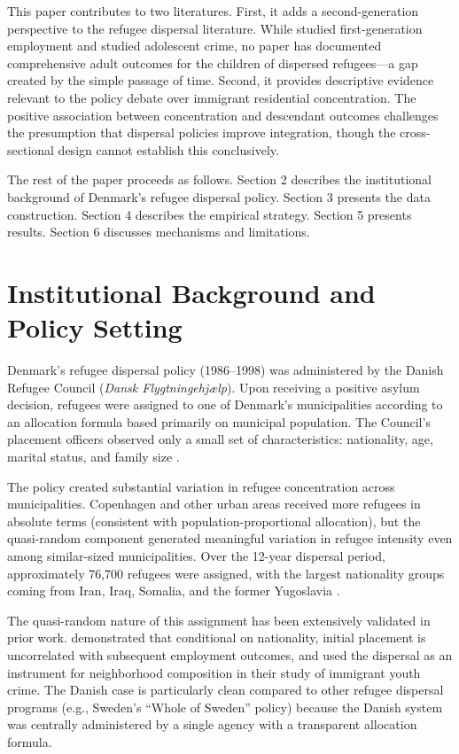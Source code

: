 \documentclass[12pt]{article}
\begin{document}
This paper contributes to two literatures. First, it adds a second-generation perspective to the refugee dispersal literature. While \citet{damm2009} studied first-generation employment and \citet{damm2014} studied adolescent crime, no paper has documented comprehensive adult outcomes for the children of dispersed refugees---a gap created by the simple passage of time. Second, it provides descriptive evidence relevant to the policy debate over immigrant residential concentration. The positive association between concentration and descendant outcomes challenges the presumption that dispersal policies improve integration, though the cross-sectional design cannot establish this conclusively.

The rest of the paper proceeds as follows. Section 2 describes the institutional background of Denmark's refugee dispersal policy. Section 3 presents the data construction. Section 4 describes the empirical strategy. Section 5 presents results. Section 6 discusses mechanisms and limitations.

\section{Institutional Background and Policy Setting}

Denmark's refugee dispersal policy (1986--1998) was administered by the Danish Refugee Council (\textit{Dansk Flygtningehj\ae lp}). Upon receiving a positive asylum decision, refugees were assigned to one of Denmark's municipalities according to an allocation formula based primarily on municipal population. The Council's placement officers observed only a small set of characteristics: nationality, age, marital status, and family size \citep{damm2009}.

The policy created substantial variation in refugee concentration across municipalities. Copenhagen and other urban areas received more refugees in absolute terms (consistent with population-proportional allocation), but the quasi-random component generated meaningful variation in refugee intensity even among similar-sized municipalities. Over the 12-year dispersal period, approximately 76,700 refugees were assigned, with the largest nationality groups coming from Iran, Iraq, Somalia, and the former Yugoslavia \citep{damm2014}.

The quasi-random nature of this assignment has been extensively validated in prior work. \citet{damm2009} demonstrated that conditional on nationality, initial placement is uncorrelated with subsequent employment outcomes, and \citet{damm2014} used the dispersal as an instrument for neighborhood composition in their study of immigrant youth crime. The Danish case is particularly clean compared to other refugee dispersal programs (e.g., Sweden's ``Whole of Sweden'' policy) because the Danish system was centrally administered by a single agency with a transparent allocation formula.
\end{document}
